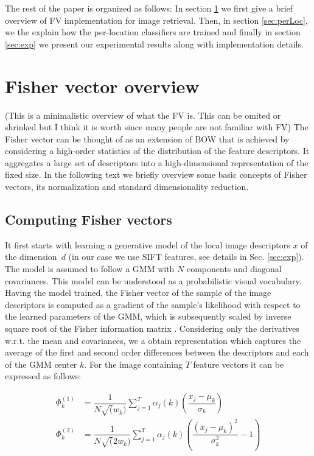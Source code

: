 \documentclass[table]{article} %
\begin{document}
	The rest of the paper is organized as follows:
	In section \ref{sec:FV} we first give a brief overview of FV implementation for image retrieval. Then, in section \ref{sec:perLoc}, we the explain how the per-location classifiers are trained  and finally in section \ref{sec:exp} we present our experimental results along with implementation details.

\section{Fisher vector overview}
\label{sec:FV}
	\textcolor{myRed}{(This is a minimalistic overview of what the FV is. This can be omited or shrinked but I think it is worth since many people are not familiar with FV)}\newline
	The Fisher vector can be thought of as an extension of BOW \cite{Sivic2003} that is achieved by considering a high-order statistics of the distribution of the feature descriptors. It aggregates a large set of descriptors into a high-dimensional representation of the fixed size. In the following text we briefly overview some basic concepts of Fisher vectors, its normalization and standard dimensionality reduction.

	\subsection{Computing Fisher vectors}
		It first starts with learning a generative model of the local image descriptors $x$ of the dimension~$d$ (in our case we use SIFT features, see details in Sec. \ref{sec:exp}). The model is assumed to follow a GMM with $N$ components and diagonal covariances. This model can be understood as a probabilistic visual vocabulary. Having the model trained, the Fisher vector of the sample of the image descriptors is computed as a gradient of the sample's likelihood with respect to the learned parameters of the GMM, which is subsequently scaled by inverse square root of the Fisher information matrix \cite{Perronnin2007}. Considering only the derivatives w.r.t. the mean and covariances, we a obtain representation which captures the average of the first and second order differences between the descriptors and each of the GMM center $k$. For the image containing $T$ feature vectors it can be expressed as follows:
		
		\begin{align}
			\Phi^{(1)}_k&=
			\dfrac{1}{N \sqrt(w_k)}\sum_{j=1}^{T} \alpha_j(k) \left(
			\dfrac{x_j-\mu_k}{\sigma_k}
			\right)
			\label{eq:FVmean}
			\\
			\Phi^{(2)}_k&=
			\dfrac{1}{N \sqrt(2w_k)}\sum_{j=1}^{T} \alpha_j(k) \left(
			\dfrac{(x_j-\mu_k)^2}{\sigma_k^2}-1 
			\right)
			\label{eq:FVvar}
		\end{align}
\end{document}
